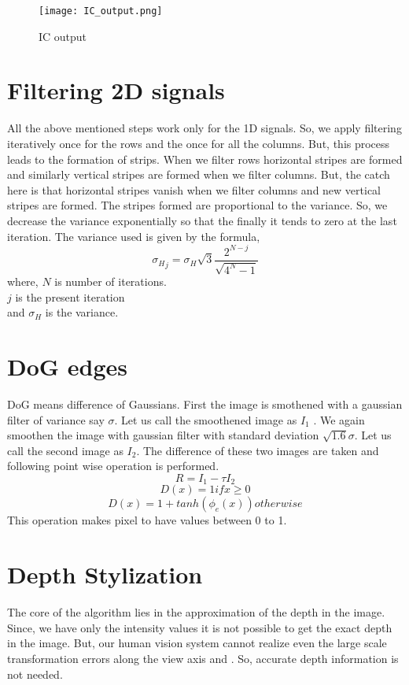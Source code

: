 \documentclass[conference]{IEEEtran}
\begin{document}
  \begin{figure}[h]
 	\texttt{[image: IC\_output.png]}
 	\caption{IC output}
 \end{figure}
 
 \section{Filtering 2D signals}
 	All the above mentioned steps work only for the 1D signals. So, we apply filtering iteratively once for the rows and the once for all the columns. But, this process leads to the formation of strips. When we filter rows horizontal stripes are formed and similarly vertical stripes are formed when we filter columns. But, the catch here is that horizontal stripes vanish when we filter columns and new vertical stripes are formed. The stripes formed are proportional to the variance. So, we decrease the variance exponentially so that the finally it tends to zero at the last iteration. The variance used is given by the formula,
 	$${\sigma_H}_j = \sigma_H \sqrt{3} \frac{2^{N-j}}{\sqrt{4^N-1}}$$
 	where, $N$ is number of iterations.\\
 	$j$ is the present iteration\\
 	and $\sigma_H$ is the variance.
 	
 
 \section{DoG edges}
 	DoG means difference of Gaussians. First the image is smothened with a gaussian filter of variance say $\sigma$. Let us call the smoothened image as $I_1$ . We again smoothen the image with gaussian filter with standard deviation $\sqrt{1.6} \sigma$. Let us call the second image as $I_2$. The difference of these two images are taken and following  point wise operation is performed.
 	$$R = I_1 -  \tau I_2$$
 	$$D(x) = 1 if x \geq 0$$
 	$$D(x)  = 1 + tanh(\phi_e(x)) otherwise$$
 	This operation makes pixel to have values between 0 to 1.
 
 \section{Depth Stylization}
  The core of the algorithm lies in the approximation of the depth in the image. Since, we have only the intensity values it is not possible to get the exact depth in the image. But, our human vision system cannot realize even the large scale transformation errors along the view axis and . So, accurate depth information is not needed.
\end{document}
